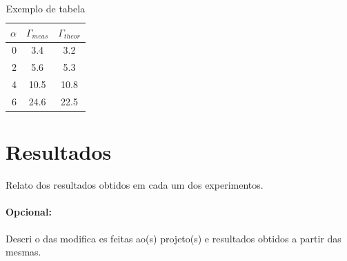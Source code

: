 \documentclass{article}
\begin{document}
\begin{table}[htb]
\caption{Exemplo de tabela}
\centering
\label{tab:exemplo}
    \begin{tabular}{rcc}
        \hline \hline
        $\alpha$ & $\Gamma_{meas}$ & $\Gamma_{theor}$ \\
        \hline
        0 & 3.4 & 3.2 \\
        2 & 5.6 & 5.3 \\
        4 & 10.5 & 10.8 \\
        6 & 24.6 & 22.5 \\
        \hline
    \end{tabular}
\end{table}

\section{Resultados}

Relato dos resultados obtidos em cada um dos experimentos.

\paragraph{Opcional:} Descri o das modifica es feitas ao(s) projeto(s) e resultados
obtidos a partir das mesmas.
\end{document}
